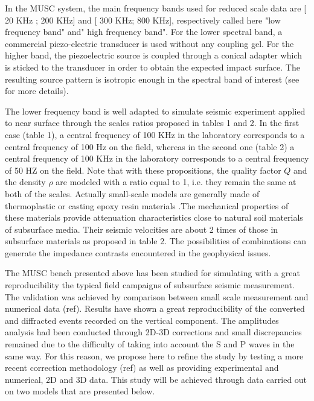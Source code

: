 \documentclass[manuscript,revised]{geophysics}
\begin{document}
\noindent In the MUSC system, the main frequency bands used for reduced scale data are [ 20 KHz ; 200 KHz] and [ 300 KHz; 800 KHz], respectively called here "low frequency band" and" high frequency band". For the lower spectral band, a commercial piezo-electric transducer is used without any coupling gel. For the higher band, the piezoelectric source is coupled through a conical adapter which is sticked to the transducer in order to obtain the expected impact surface. The resulting source pattern is isotropic enough in the spectral band of interest (see \citep{Bretaudeau_SSM_2011} for more details).

\noindent The lower frequency band is well adapted to simulate seismic experiment applied to near surface through the scales ratios proposed in tables 1 and 2. In the first case (table 1), a central frequency of 100 KHz in the laboratory corresponds to a central frequency of 100 Hz on the field, whereas in the second one (table 2) a central frequency of 100 KHz in the laboratory corresponds to a central frequency of 50 HZ on the field. Note that with these propositions, the  quality factor $Q$ and the density $\rho$ are modeled with a ratio equal to 1, i.e. they remain the same at both of the scales. Actually small-scale models are generally made of thermoplastic or casting epoxy resin materials \citep{Bretaudeau_FWI_2013,Bretaudeau_SSM_2011,Bretaudeau_SSA_2008b}.The mechanical properties of these materials provide attenuation characteristics close to natural soil materials of subsurface media. Their seismic velocities are about 2 times of those in subsurface materials as proposed in table 2. The possibilities of combinations can generate the impedance contrasts encountered in the geophysical issues. 

\noindent The MUSC bench presented above has been studied for simulating with a great reproducibility the typical field campaigns of subsurface seismic measurement. The validation was achieved by comparison between small scale measurement and numerical data (ref). Results have shown a great reproducibility of the converted and diffracted events recorded on the vertical component. The amplitudes analysis had been conducted through 2D-3D corrections and small discrepancies remained due to the difficulty of taking into account the S and P waves in the same way. For this reason, we propose here to refine the study by testing a more recent correction methodology (ref) as well as providing experimental and numerical, 2D and 3D data. This study will be achieved through data carried out on two models that are presented below.
\end{document}
